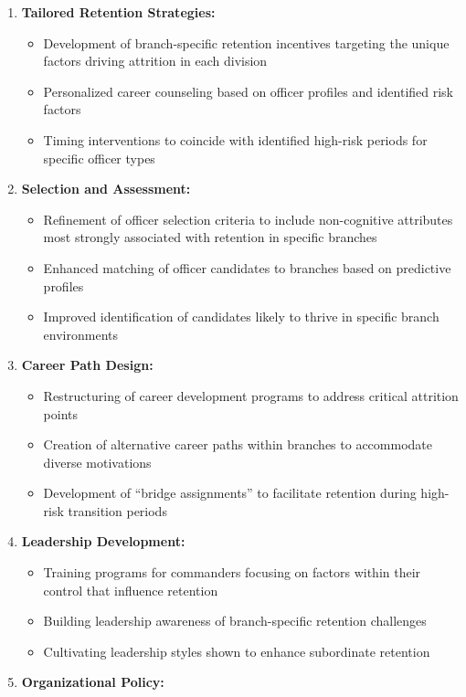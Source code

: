\documentclass[./main.tex]{subfiles}
\providecommand{\tightlist}{%
  \setlength{\itemsep}{0pt}\setlength{\parskip}{0pt}}
\begin{document}
\begin{enumerate}
\def\labelenumi{\arabic{enumi}.}
\tightlist
\item
  \textbf{Tailored Retention Strategies:}

  \begin{itemize}
  \tightlist
  \item
    Development of branch-specific retention incentives targeting the
    unique factors driving attrition in each division
  \item
    Personalized career counseling based on officer profiles and
    identified risk factors
  \item
    Timing interventions to coincide with identified high-risk periods
    for specific officer types
  \end{itemize}
\item
  \textbf{Selection and Assessment:}

  \begin{itemize}
  \tightlist
  \item
    Refinement of officer selection criteria to include non-cognitive
    attributes most strongly associated with retention in specific
    branches
  \item
    Enhanced matching of officer candidates to branches based on
    predictive profiles
  \item
    Improved identification of candidates likely to thrive in specific
    branch environments
  \end{itemize}
\item
  \textbf{Career Path Design:}

  \begin{itemize}
  \tightlist
  \item
    Restructuring of career development programs to address critical
    attrition points
  \item
    Creation of alternative career paths within branches to accommodate
    diverse motivations
  \item
    Development of ``bridge assignments'' to facilitate retention during
    high-risk transition periods
  \end{itemize}
\item
  \textbf{Leadership Development:}

  \begin{itemize}
  \tightlist
  \item
    Training programs for commanders focusing on factors within their
    control that influence retention
  \item
    Building leadership awareness of branch-specific retention
    challenges
  \item
    Cultivating leadership styles shown to enhance subordinate retention
  \end{itemize}
\item
  \textbf{Organizational Policy:}


\end{enumerate}
\end{document}

